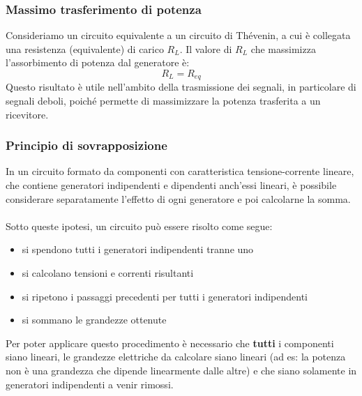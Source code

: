 \documentclass{article}
\begin{document}
\subsubsection{Massimo trasferimento di potenza}
Consideriamo un circuito equivalente a un circuito di Thévenin, a cui è collegata una resistenza (equivalente) di carico $R_L$.
Il valore di $R_L$ che massimizza l'assorbimento di potenza dal generatore è:
$$ R_L=R_{eq} $$
Questo risultato è utile nell'ambito della trasmissione dei segnali, in particolare di segnali deboli, poiché permette di massimizzare la potenza trasferita a un ricevitore.

\subsubsection{Principio di sovrapposizione}
In un circuito formato da componenti con caratteristica tensione-corrente lineare, che contiene generatori indipendenti e dipendenti anch'essi lineari, è possibile considerare separatamente l'effetto di ogni generatore e poi calcolarne la somma.\\\\
Sotto queste ipotesi, un circuito può essere risolto come segue:
\begin{itemize}
    \item si spendono tutti i generatori indipendenti tranne uno
    \item si calcolano tensioni e correnti risultanti
    \item si ripetono i passaggi precedenti per tutti i generatori indipendenti
    \item si sommano le grandezze ottenute
\end{itemize}
Per poter applicare questo procedimento è necessario che \textbf{tutti} i componenti siano lineari, le grandezze elettriche da calcolare siano lineari (ad es: la potenza non è una grandezza che dipende linearmente dalle altre) e che siano solamente in generatori indipendenti a venir rimossi.






\newpage
\Index
\end{document}
